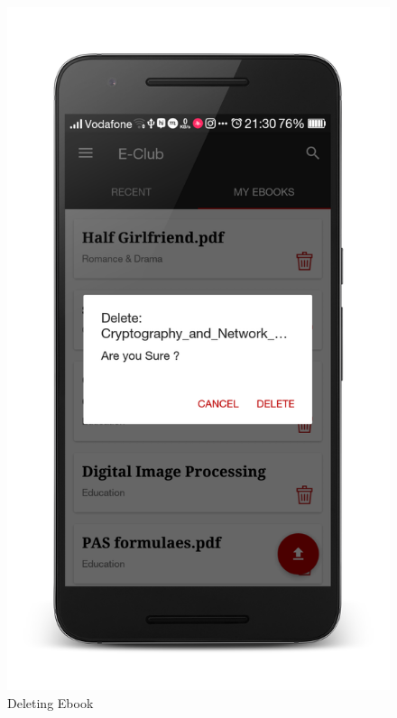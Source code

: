 \begin{figure}[ht]
\centering
\includegraphics[scale=0.13]{images/d1.png}
\caption{Deleting Ebook}
\end{figure}

\newpage


